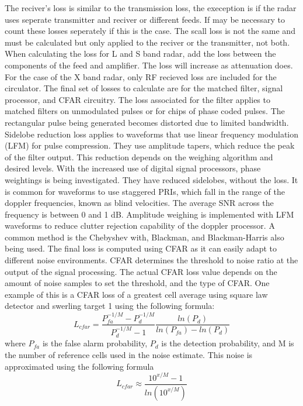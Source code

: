 \documentclass[12pt]{article}
\begin{document}
The reciver's loss is similar to the transmission loss, the exeception is if the radar uses seperate transmitter and reciver or different feeds. If may be necessary to count these losses seperately if this is the case. The scall loss is not the same and must be calculated but only applied to the reciver or the transmitter, not both. When calculating the loss for L and S band radar, add the loss between the components of the feed and amplifier. The loss will increase as attenuation does. For the case of the X band radar, only RF recieved loss are included for the circulator. The final set of losses to calculate are for the matched filter, signal processor, and CFAR circuitry. The loss associated for the filter applies to matched filters on unmodulated pulses or for chips of phase coded pulses. The rectangular pulse being generated becomes distorted due to limited bandwidth. Sidelobe reduction loss applies to waveforms that use linear frequency modulation (LFM) for pulse compression. They use amplitude tapers, which reduce the peak of the filter output. This reduction depends on the weighing algorithm and desired levels. With the increased use of digital signal processors, phase weightings is being investigated. They have reduced sidelobes, without the loss. It is common for waveforms to use staggered PRIs, which fall in the range of the doppler frequencies, known as blind velocities. The average SNR across the frequency is between 0 and 1 dB. Amplitude weighing is implemented with LFM waveforms to reduce clutter rejection capability of the doppler processor. A common method is the Chebyshev with, Blackman, and Blackman-Harris also being used. The final loss is computed using CFAR as it can easily adapt to different noise environments. CFAR determines the threshold to noise ratio at the output of the signal processing. The actual CFAR loss value depends on the amount of noise samples to set the threshold, and the type of CFAR. One example of this is a CFAR loss of a greatest cell average using square law detector and swerling target 1 using the following formula:
\begin{equation}
    L_{cfar} = \frac{P_{fa}^{-1/M}-P_d^{-1/M}}{P_d^{-1/M}-1} \frac{ln(P_d)}{ ln(P_{fa})-ln(P_d) }
\end{equation}
where $P_{fa}$ is the false alarm probability, $P_d$ is the detection probability, and M is the number of reference cells used in the noise estimate. This noise is approximated using the following formula
\begin{equation}
    L_{cfar} \approx \frac{10^{x/M}-1}{ln(10^{x/M}) }
\end{equation}
\end{document}
